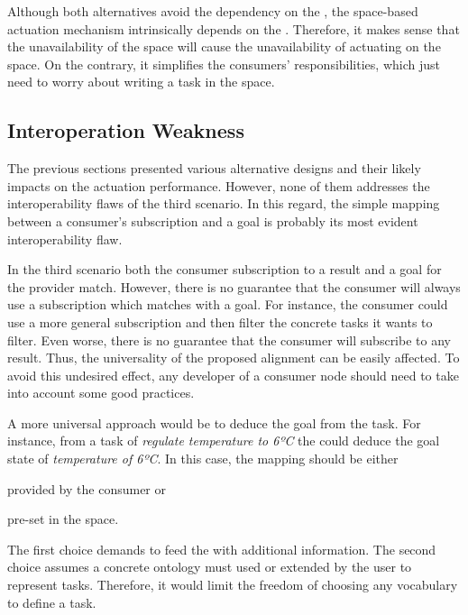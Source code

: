 Although both alternatives avoid the dependency on the \Space{}, the space-based actuation mechanism intrinsically depends on the \Space{}.
Therefore, it makes sense that the unavailability of the space will cause the unavailability of actuating on the space.
On the contrary, it simplifies the consumers' responsibilities, which just need to worry about writing a task in the space.



\subsection{Interoperation Weakness}

The previous sections presented various alternative designs and their likely impacts on the actuation performance.
However, none of them addresses the interoperability flaws of the third scenario.
In this regard, the simple mapping between a consumer's subscription and a goal is probably its most evident interoperability flaw.


In the third scenario both the consumer subscription to a result and a goal for the provider match.
However, there is no guarantee that the consumer will always use a subscription which matches with a goal.
For instance, the consumer could use a more general subscription and then filter the concrete tasks it wants to filter.
Even worse, there is no guarantee that the consumer will subscribe to any result.
Thus, the universality of the proposed alignment can be easily affected.
To avoid this undesired effect, any developer of a consumer node should need to take into account some good practices. %


A more universal approach would be to deduce the goal from the task. %
For instance, from a task of \emph{regulate temperature to 6ºC} the \Space{} could deduce the goal state of \emph{temperature of 6ºC}.
In this case, the mapping should be either
\begin{enumerate*}[label=\itshape(\arabic*\upshape)]
  \item provided by the consumer or
  \item pre-set in the space.
\end{enumerate*}
The first choice demands to feed the \Space{} with additional information. %
The second choice assumes a concrete ontology must used or extended by the user to represent tasks.
Therefore, it would limit the freedom of choosing any vocabulary to define a task.


